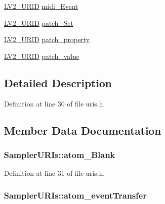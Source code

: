 \begin{DoxyCompactItemize}
\item 
\hyperlink{urid_8h_a5ff0630d245539e9f6dca10ff3c40fae}{L\+V2\+\_\+\+U\+R\+ID} \hyperlink{struct_sampler_u_r_is_ac58da4e9040fe1f2e78a13da850f079b}{midi\+\_\+\+Event}
\item 
\hyperlink{urid_8h_a5ff0630d245539e9f6dca10ff3c40fae}{L\+V2\+\_\+\+U\+R\+ID} \hyperlink{struct_sampler_u_r_is_aff70adc237ca659ac03facb7bf9cd728}{patch\+\_\+\+Set}
\item 
\hyperlink{urid_8h_a5ff0630d245539e9f6dca10ff3c40fae}{L\+V2\+\_\+\+U\+R\+ID} \hyperlink{struct_sampler_u_r_is_a3b6dd165b43fec7dda85edb8f8acca13}{patch\+\_\+property}
\item 
\hyperlink{urid_8h_a5ff0630d245539e9f6dca10ff3c40fae}{L\+V2\+\_\+\+U\+R\+ID} \hyperlink{struct_sampler_u_r_is_a143182ea5b6247aa88eb051382745673}{patch\+\_\+value}
\end{DoxyCompactItemize}


\subsection{Detailed Description}


Definition at line 30 of file uris.\+h.



\subsection{Member Data Documentation}
\subsubsection[{\texorpdfstring{atom\+\_\+\+Blank}{atom_Blank}}]{ Sampler\+U\+R\+Is\+::atom\+\_\+\+Blank}\hypertarget{struct_sampler_u_r_is_a700696fb7f3df0b50fef56e3d120e373}{}\label{struct_sampler_u_r_is_a700696fb7f3df0b50fef56e3d120e373}


Definition at line 31 of file uris.\+h.

\subsubsection[{\texorpdfstring{atom\+\_\+event\+Transfer}{atom_eventTransfer}}]{ Sampler\+U\+R\+Is\+::atom\+\_\+event\+Transfer}\hypertarget{struct_sampler_u_r_is_adcfc60f5f0d554e48eb3f19e3f1e4e9f}{}\label{struct_sampler_u_r_is_adcfc60f5f0d554e48eb3f19e3f1e4e9f}


